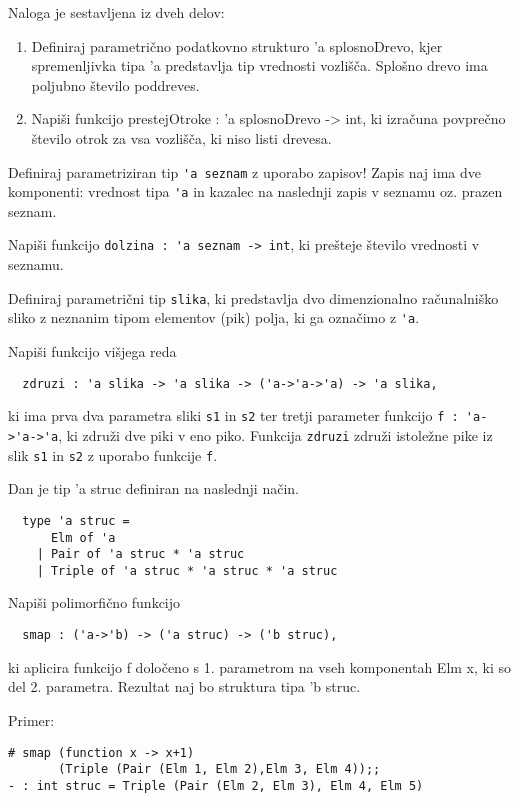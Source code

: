 \begin{ex}
Naloga je sestavljena iz dveh delov:
\begin{enumerate}
    \item Definiraj parametri\v cno podatkovno strukturo 'a splosnoDrevo, kjer spremenljivka tipa 'a predstavlja tip vrednosti vozli\v s\v ca. Splo\v sno drevo ima poljubno \v stevilo poddreves. 
    
    \item Napi\v si funkcijo prestejOtroke : 'a splosnoDrevo -> int, ki izra\v cuna povpre\v cno \v stevilo otrok za vsa vozli\v s\v ca, ki niso listi drevesa.
\end{enumerate}

\end{ex}
\begin{ex}
  Definiraj parametriziran tip \lstinline{'a seznam} z uporabo zapisov!
  Zapis naj ima dve komponenti: vrednost tipa \lstinline{'a} in kazalec na
  naslednji zapis v seznamu oz. prazen seznam.

  Napi\v si funkcijo \lstinline{dolzina : 'a seznam -> int}, ki
  pre\v steje \v stevilo vrednosti v seznamu.


\end{ex} 
\begin{ex}
  Definiraj parametri\v cni tip \lstinline{slika}, ki predstavlja
  dvo dimenzionalno ra\v cunalni\v sko sliko z neznanim tipom
  elementov (pik) polja, ki ga ozna\v cimo z \lstinline{'a}.

  Napi\v si funkcijo vi\v sjega reda

\begin{lstlisting}
  zdruzi : 'a slika -> 'a slika -> ('a->'a->'a) -> 'a slika,
\end{lstlisting}
  ki ima prva dva parametra sliki \lstinline{s1} in \lstinline{s2} ter
  tretji parameter funkcijo \lstinline{f : 'a->'a->'a}, ki zdru\v zi dve
  piki v eno piko. Funkcija \lstinline{zdruzi} zdru\v zi istole\v zne
  pike iz slik \lstinline{s1} in \lstinline{s2} z uporabo funkcije
  \lstinline{f}.


\end{ex} 
\begin{ex}
  Dan je tip 'a struc definiran na naslednji na\v cin.
\begin{lstlisting}
  type 'a struc = 
      Elm of 'a 
    | Pair of 'a struc * 'a struc 
    | Triple of 'a struc * 'a struc * 'a struc
\end{lstlisting}
  Napi\v si polimorfi\v cno funkcijo
\begin{lstlisting}
  smap : ('a->'b) -> ('a struc) -> ('b struc),
\end{lstlisting}
  ki aplicira funkcijo f dolo\v ceno s 1. parametrom na vseh
  komponentah Elm x, ki so del 2. parametra. Rezultat naj bo struktura
  tipa 'b struc.

\noindent\/Primer:            
\begin{lstlisting}
# smap (function x -> x+1) 
       (Triple (Pair (Elm 1, Elm 2),Elm 3, Elm 4));; 
- : int struc = Triple (Pair (Elm 2, Elm 3), Elm 4, Elm 5) 
\end{lstlisting}

\end{ex} 
